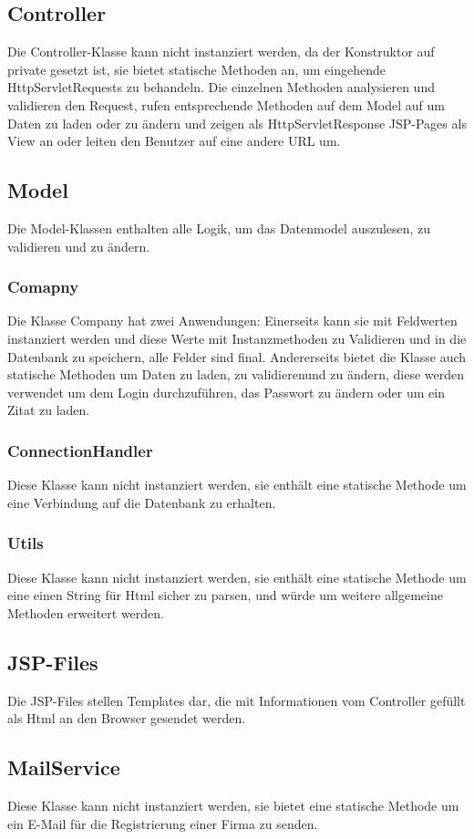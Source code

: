 \documentclass[12pt]{scrartcl}
\begin{document}
\subsection{Controller}
Die Controller-Klasse kann nicht instanziert werden, da der Konstruktor auf private gesetzt ist, sie bietet statische Methoden an, um eingehende HttpServletRequests zu behandeln. Die einzelnen Methoden analysieren  und validieren den Request, rufen entsprechende Methoden auf dem Model auf um Daten zu laden oder zu ändern und zeigen als HttpServletResponse JSP-Pages als View an oder leiten den Benutzer auf eine andere URL um.
\subsection{Model}
Die Model-Klassen enthalten alle Logik, um das Datenmodel auszulesen, zu validieren und zu ändern.
\subsubsection{Comapny}
Die Klasse Company hat zwei Anwendungen:
Einerseits kann sie mit Feldwerten instanziert werden und diese Werte mit Instanzmethoden zu Validieren und in die Datenbank zu speichern, alle Felder sind final.
Andererseits bietet die Klasse auch statische Methoden um Daten zu laden, zu validierenund zu ändern, diese werden verwendet um dem Login durchzuführen, das Passwort zu ändern oder um ein Zitat zu laden.
\subsubsection{ConnectionHandler}
Diese Klasse kann nicht instanziert werden, sie enthält eine statische Methode um eine Verbindung auf die Datenbank zu erhalten.
\subsubsection{Utils}
Diese Klasse kann nicht instanziert werden, sie enthält eine statische Methode um eine einen String für Html sicher zu parsen, und würde um weitere allgemeine Methoden erweitert werden.
\subsection{JSP-Files}
Die JSP-Files stellen Templates dar, die mit Informationen vom Controller gefüllt als Html an den Browser gesendet werden.
\subsection{MailService}
Diese Klasse kann nicht instanziert werden, sie bietet eine statische Methode um ein E-Mail für die Registrierung einer Firma zu senden.
\end{document}
